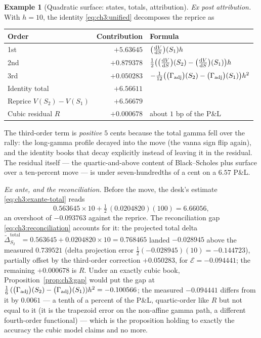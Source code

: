 \documentclass[11pt]{book}
\theoremstyle{plain}
\theoremstyle{definition}
\newtheorem{example}[theorem]{Example}
\theoremstyle{remark}
\newcommand{\Gadj}{\Gamma_{\mathrm{adj}}}        %
\newcommand{\dd}{\mathrm{d}}                                  %
\newcommand{\td}[2]{\frac{\dd #1}{\dd #2}}                    %
\begin{document}
\begin{example}[Quadratic surface: states, totals, attribution]
\emph{Ex post attribution.} With $h = 10$, the identity
\eqref{eq:ch3:unified} decomposes the reprice as
\begin{center}
\renewcommand{\arraystretch}{1.3}
\begin{tabular}{@{}lrl@{}}
\toprule
Order & Contribution & Formula \\
\midrule
1st & $+5.63645$ & $\evalat{\td{V}{S}}{S_1} h$ \\
2nd & $+0.879378$ & $\tfrac{1}{2}\bigl(\evalat{\td{V}{S}}{S_2} -
\evalat{\td{V}{S}}{S_1}\bigr) h$ \\
3rd & $+0.050283$ & $-\tfrac{1}{12}\bigl(\evalat{\Gadj}{S_2} -
\evalat{\Gadj}{S_1}\bigr) h^2$ \\
\midrule
Identity total & $+6.56611$ & \\
Reprice $V(S_2) - V(S_1)$ & $+6.56679$ & \\
Cubic residual $R$ & $+0.000678$ & about $1$ bp of the P\&L \\
\bottomrule
\end{tabular}
\end{center}
The third-order term is \emph{positive} $5$ cents because the total gamma
fell over the rally: the long-gamma profile decayed into the move (the vanna
sign flip again), and the identity books that decay explicitly instead of
leaving it in the residual. The residual itself --- the quartic-and-above
content of Black--Scholes plus surface over a ten-percent move --- is under
seven-hundredths of a cent on a $6.57$ P\&L.

\emph{Ex ante, and the reconciliation.} Before the move, the desk's estimate
\eqref{eq:ch3:exante-total} reads
\[
  0.563645 \times 10 + \tfrac{1}{2}\,(0.0204820)(100) = 6.66056 ,
\]
an overshoot of $-0.093763$ against the reprice. The reconciliation gap
\eqref{eq:ch3:reconciliation} accounts for it: the projected total delta
$\tilde{\Delta}^{\mathrm{total}}_{S_2} = 0.563645 + 0.0204820 \times 10
= 0.768465$ landed $-0.028945$ above the measured $0.739521$ (delta
projection error $\tfrac{1}{2}(-0.028945)(10) = -0.144723$), partially
offset by the third-order correction $+0.050283$, for
$\mathcal{E} = -0.094441$; the remaining $+0.000678$ is $R$. Under an exactly
cubic book, Proposition~\ref{prop:ch3:gap} would put the gap at
$\tfrac{1}{6}\,(\evalat{\Gadj}{S_2}-\evalat{\Gadj}{S_1})h^2 = -0.100566$; the
measured $-0.094441$ differs from it by $0.0061$ --- a tenth of a percent of
the P\&L, quartic-order like $R$ but not equal to it (it is the trapezoid
error on the non-affine gamma path, a different fourth-order functional) ---
which is the proposition holding to exactly the accuracy the cubic model
claims and no more.


\end{example}
\end{document}
